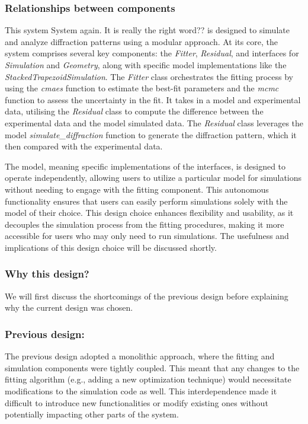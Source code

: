 \subsubsection{Relationships between components}

\medskip

This system \color{red}System again. It is really the right word?? \color{black} is designed to simulate and analyze diffraction patterns using
a modular approach. At its core, the system comprises several key components:
the \textit{Fitter}, \textit{Residual}, and interfaces for \textit{Simulation}
and \textit{Geometry}, along with specific model implementations like the
\textit{StackedTrapezoidSimulation}. The \textit{Fitter} class orchestrates
the fitting process by using the \textit{cmaes} function to estimate the best-fit parameters and
the \textit{mcmc} function to assess the uncertainty in the fit. It takes in a model and
experimental data, utilising the \textit{Residual} class to compute the difference between
the experimental data and the model simulated data. The \textit{Residual} class leverages
the model \textit{simulate\_diffraction} function to generate the diffraction pattern,
which it then compared with the experimental data.

\medskip

The model, meaning specific implementations of the interfaces, is designed to operate 
independently, allowing users to utilize a particular model
for simulations without needing to engage with the fitting component. This autonomous 
functionality ensures that users can easily perform simulations solely with the model of
 their choice. This design choice enhances flexibility and usability, as it decouples the simulation process from the fitting procedures, making it more accessible for users who may only need to run simulations.
The usefulness and implications of this design choice will be discussed shortly.


\subsubsection{Why this design?}
We will first discuss the shortcomings of the previous design before explaining why the current design was chosen.

\subsubsection*{Previous design:}

The previous design adopted a monolithic approach, where the fitting and simulation components were tightly coupled. This meant that any changes to the fitting algorithm (e.g., adding a new optimization technique) would necessitate modifications to the simulation code as well. This interdependence made it difficult to introduce new functionalities or modify existing ones without potentially impacting other parts of the system.

